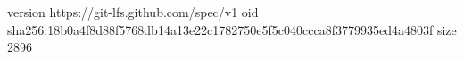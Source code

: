 version https://git-lfs.github.com/spec/v1
oid sha256:18b0a4f8d88f5768db14a13e22c1782750e5f5c040ccca8f3779935ed4a4803f
size 2896
